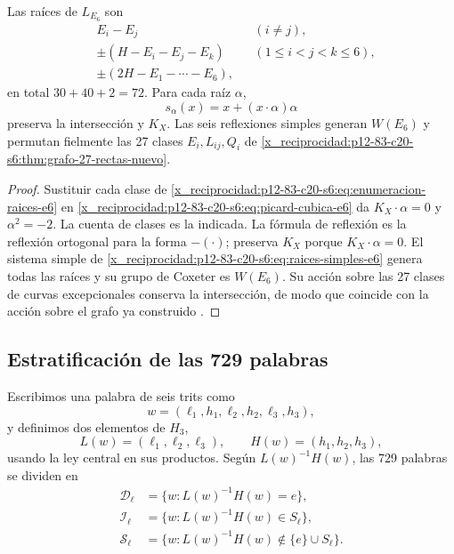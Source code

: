 \begin{proposition}
\label{x_reciprocidad:p12-83-c20-s6:prop:setenta-dos-raices-e6}
Las raíces de \(L_{E_6}\) son
\begin{equation}
 \begin{aligned}
 &E_i-E_j &&(i\ne j),\\
 &\pm(H-E_i-E_j-E_k) &&(1\le i<j<k\le6),\\
 &\pm(2H-E_1-\cdots-E_6),
 \end{aligned}
 \label{x_reciprocidad:p12-83-c20-s6:eq:enumeracion-raices-e6}
\end{equation}
en total \(30+40+2=72\). Para cada raíz \(\alpha\),
\begin{equation}
 s_\alpha(x)=x+(x\cdot\alpha)\alpha
 \label{x_reciprocidad:p12-83-c20-s6:eq:reflexion-raiz-e6}
\end{equation}
preserva la intersección y \(K_X\). Las seis reflexiones simples generan
\(W(E_6)\) y permutan fielmente las 27 clases
\(E_i,L_{ij},Q_i\) de \cref{x_reciprocidad:p12-83-c20-s6:thm:grafo-27-rectas-nuevo}.
\end{proposition}

\begin{proof}
Sustituir cada clase de \cref{x_reciprocidad:p12-83-c20-s6:eq:enumeracion-raices-e6} en
\cref{x_reciprocidad:p12-83-c20-s6:eq:picard-cubica-e6} da \(K_X\cdot\alpha=0\) y
\(\alpha^2=-2\). La cuenta de clases es la indicada. La fórmula de reflexión
es la reflexión ortogonal para la forma \(-(\cdot)\); preserva \(K_X\) porque
\(K_X\cdot\alpha=0\). El sistema simple de
\cref{x_reciprocidad:p12-83-c20-s6:eq:raices-simples-e6} genera todas las raíces y su grupo de Coxeter es
\(W(E_6)\). Su acción sobre las 27 clases de curvas excepcionales conserva la
intersección, de modo que coincide con la acción sobre el grafo ya
construido \cite{x_reciprocidad:Manivel2005}.
\end{proof}

\subsection{Estratificación de las 729 palabras}

Escribimos una palabra de seis trits como
\[
 w=(\ell_1,h_1,\ell_2,h_2,\ell_3,h_3),
\]
y definimos dos elementos de \(H_3\),
\[
 L(w)=(\ell_1,\ell_2,\ell_3),\qquad
 H(w)=(h_1,h_2,h_3),
\]
usando la ley central en sus productos. Según
\(L(w)^{-1}H(w)\), las 729 palabras se dividen en
\begin{align*}
 \mathcal D_\ell&=\{w:L(w)^{-1}H(w)=e\},\\
 \mathcal I_\ell&=\{w:L(w)^{-1}H(w)\in S_\ell\},\\
 \mathcal S_\ell&=\{w:L(w)^{-1}H(w)\notin\{e\}\cup S_\ell\}.
\end{align*}

